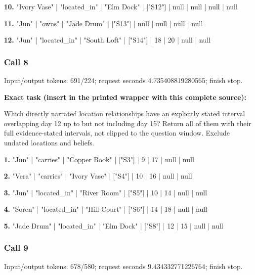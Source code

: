 \noindent\textbf{10.} "Ivory Vase" | "located\_in" | "Elm Dock" | ["S12"] | null | null | null | null\par\smallskip

\noindent\textbf{11.} "Jun" | "owns" | "Jade Drum" | ["S13"] | null | null | null | null\par\smallskip

\noindent\textbf{12.} "Jun" | "located\_in" | "South Loft" | ["S14"] | 18 | 20 | null | null\par\smallskip

\subsubsection*{Call 8}

Input/output tokens: 691/224; request seconds 4.735408819280565; finish stop.

\noindent\textbf{Exact task (insert in the printed wrapper with this complete source):}\par Which directly narrated location relationships have an explicitly stated interval overlapping day 12 up to but not including day 15? Return all of them with their full evidence-stated intervals, not clipped to the question window. Exclude undated locations and beliefs.

\noindent\textbf{1.} "Jun" | "carries" | "Copper Book" | ["S3"] | 9 | 17 | null | null\par\smallskip

\noindent\textbf{2.} "Vera" | "carries" | "Ivory Vase" | ["S4"] | 10 | 16 | null | null\par\smallskip

\noindent\textbf{3.} "Jun" | "located\_in" | "River Room" | ["S5"] | 10 | 14 | null | null\par\smallskip

\noindent\textbf{4.} "Soren" | "located\_in" | "Hill Court" | ["S6"] | 14 | 18 | null | null\par\smallskip

\noindent\textbf{5.} "Jade Drum" | "located\_in" | "Elm Dock" | ["S8"] | 12 | 15 | null | null\par\smallskip

\subsubsection*{Call 9}

Input/output tokens: 678/580; request seconds 9.434332771226764; finish stop.

